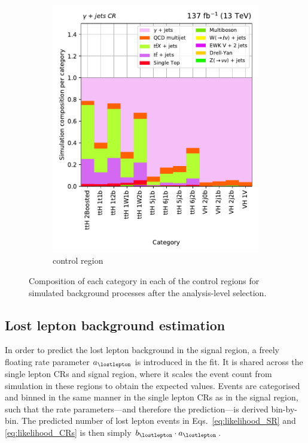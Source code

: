 \begin{figure}[htbp]
    \begin{subfigure}[b]{0.33\textwidth}
        \includegraphics[width=\textwidth]{figures/region_plots/full_Run2/region_5/background_composition.pdf}
        \caption{\singlePhotonCr control region}
    \end{subfigure}
    \caption[Composition of each category in each of the control regions for simulated background processes after the analysis-level selection]{Composition of each category in each of the control regions for simulated background processes after the analysis-level selection.}
    \label{fig:htoinv_cr_composition_comb2016to18}
\end{figure}




\subsection{Lost lepton background estimation}
\label{subsubsec:htoinv_lost_lepton_bkg}

In order to predict the lost lepton background in the signal region, a freely floating rate parameter $a_{\lostlepton}$ is introduced in the fit. It is shared across the single lepton \glspl{CR} and signal region, where it scales the event count from simulation in these regions to obtain the expected values. Events are categorised and binned in the same manner in the single lepton \glspl{CR} as in the signal region, such that the rate parameters---and therefore the prediction---is derived bin-by-bin. The predicted number of lost lepton events in Eqs.~\ref{eq:likelihood_SR} and \ref{eq:likelihood_CRs} is then simply $b_{\lostlepton} \cdot a_{\lostlepton}$.

